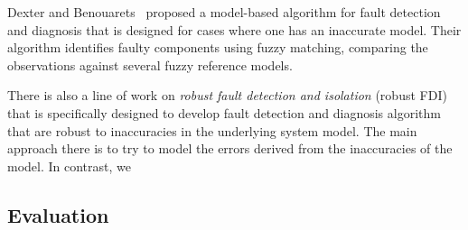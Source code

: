 \documentclass[12pt]{article}
\begin{document}

Dexter and Benouarets~\cite{dexter1997model} proposed a model-based algorithm for fault detection and diagnosis that is designed for cases where one has an inaccurate model. Their algorithm identifies faulty components using fuzzy matching, comparing the observations against several fuzzy reference models. 

There is also a line of work on {\em robust fault detection and isolation} (robust FDI)~\cite{chen2012robust} that is specifically designed to develop fault detection and diagnosis algorithm that are robust to inaccuracies in the underlying system model. The main approach there is to try to model the errors derived from the inaccuracies of the model. In contrast, we 











\subsection{Evaluation}
\end{document}
